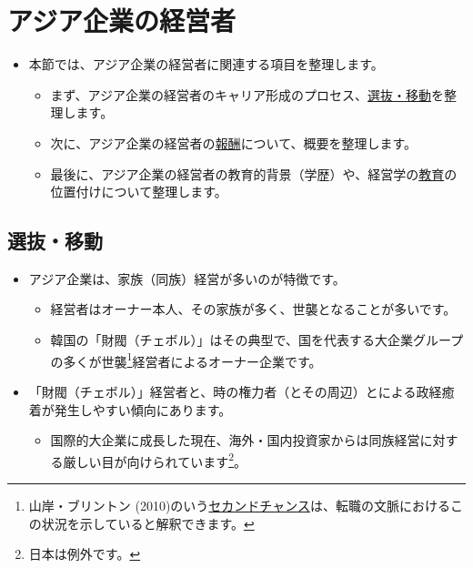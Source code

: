 \documentclass[
]{book}
\providecommand{\tightlist}{%
  \setlength{\itemsep}{0pt}\setlength{\parskip}{0pt}}
\begin{document}
\hypertarget{asia-manager}{%
\section{アジア企業の経営者}\label{asia-manager}}

\begin{itemize}
\item
  本節では、アジア企業の経営者に関連する項目を整理します。

  \begin{itemize}
  \item
    まず、アジア企業の経営者のキャリア形成のプロセス、\protect\hyperlink{asia-selection}{選抜・移動}を整理します。
  \item
    次に、アジア企業の経営者の\protect\hyperlink{asia-payment}{報酬}について、概要を整理します。
  \item
    最後に、アジア企業の経営者の教育的背景（学歴）や、経営学の\protect\hyperlink{asia-education}{教育}の位置付けについて整理します。
  \end{itemize}
\end{itemize}

\hypertarget{asia-selection}{%
\subsection{選抜・移動}\label{asia-selection}}

\begin{itemize}
\item
  アジア企業は、家族（同族）経営が多いのが特徴です。

  \begin{itemize}
  \item
    経営者はオーナー本人、その家族が多く、世襲となることが多いです。
  \item
    韓国の「財閥（チェボル）」はその典型で、国を代表する大企業グループの多くが世襲\footnote{山岸・ブリントン (2010)のいう\protect\hyperlink{labor}{セカンドチャンス}は、転職の文脈におけるこの状況を示していると解釈できます。}経営者によるオーナー企業です。
  \end{itemize}
\end{itemize}

\begin{itemize}
\item
  「財閥（チェボル）」経営者と、時の権力者（とその周辺）とによる政経癒着が発生しやすい傾向にあります。

  \begin{itemize}
  \tightlist
  \item
    国際的大企業に成長した現在、海外・国内投資家からは同族経営に対する厳しい目が向けられています\footnote{日本は例外です。}。
  \end{itemize}
\end{itemize}
\end{document}

